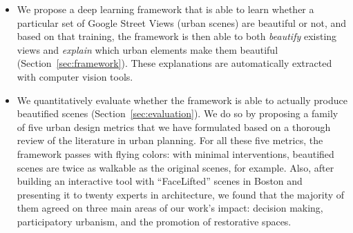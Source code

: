 \begin{itemize}
\item We propose a deep learning framework that is able to learn whether a particular set of Google Street Views (urban scenes) are beautiful or not, and based on that training, the framework is then able to both \emph{beautify} existing views and \emph{explain} which urban elements  make them beautiful (Section~\ref{sec:framework}). These explanations are automatically extracted with computer vision tools. 

\item We quantitatively evaluate whether the framework is able to actually produce beautified scenes (Section~\ref{sec:evaluation}). We do so by proposing a family of five urban design metrics that we have formulated based on a thorough review of the literature in urban planning. For all these five metrics, the framework passes with flying colors: with minimal interventions, beautified scenes are twice as walkable as the original scenes, for example. Also, after building an interactive tool with ``FaceLifted'' scenes in Boston and presenting it to twenty experts in architecture,  we found that the majority of them agreed on three main areas of our work's impact: decision making, participatory urbanism, and the promotion of restorative spaces.
\end{itemize}





